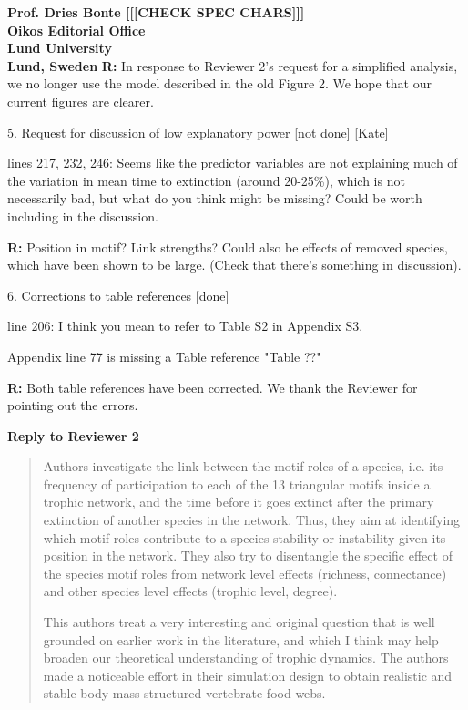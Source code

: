 \documentclass[12pt]{letter}
\begin{document}
\begin{letter}{\bf Prof. Dries Bonte [[[CHECK SPEC CHARS]]]\\
Oikos Editorial Office \\
Lund University \\
Lund, Sweden}
    \textbf{R:} In response to Reviewer 2's request for a simplified analysis, we no longer use the model described in the old Figure 2. We hope that our current figures are clearer.

  5. Request for discussion of low explanatory power [not done] [Kate]

    lines 217, 232, 246: Seems like the predictor variables are not explaining much of the variation in mean time to extinction (around 20-25\%), which is not necessarily bad, but what do you think might be missing? Could be worth including in the discussion.

    \textbf{R:}
    Position in motif? Link strengths? Could also be effects of removed species, which have been shown to be large. (Check that there's something in discussion).


  6. Corrections to table references [done]

    line 206: I think you mean to refer to Table S2 in Appendix S3.

    Appendix line 77 is missing a Table reference "Table ??"

    \textbf{R:} Both table references have been corrected. We thank the Reviewer for pointing out the errors.


\clearpage

\Large{\textbf{Reply to Reviewer 2}}

  \begin{quotation}
  Authors investigate the link between the motif roles of a species, i.e. its frequency of participation to each of the 13 triangular motifs inside a trophic network, and the time before it goes extinct after the primary extinction of another species in the network. Thus, they aim at identifying which motif roles contribute to a species stability or instability given its position in the network. They also try to disentangle the specific effect of the species motif roles from network level effects (richness, connectance) and other species level effects (trophic level, degree).


  This authors treat a very interesting and original question that is well grounded on earlier work in the literature, and which I think may help broaden our theoretical understanding of trophic dynamics. The authors made a noticeable effort in their simulation design to obtain realistic and stable body-mass structured vertebrate food webs.



\end{quotation}
\end{letter}
\end{document}
